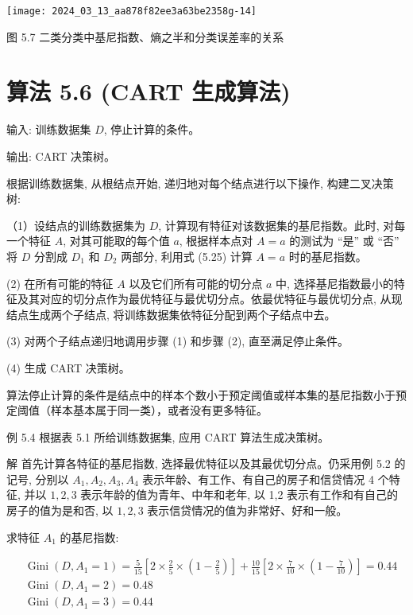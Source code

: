 \documentclass[10pt]{article}
\begin{document}
\begin{CJK*}{UTF8}{bsmi}
\begin{center}
\texttt{[image: 2024\_03\_13\_aa878f82ee3a63be2358g-14]}
\end{center}

图 5.7 二类分类中基尼指数、熵之半和分类误差率的关系

\section*{算法 5.6 (CART 生成算法)}
输入: 训练数据集 $D$, 停止计算的条件。

输出: CART 决策树。

根据训练数据集, 从根结点开始, 递归地对每个结点进行以下操作, 构建二叉决策树:

（1）设结点的训练数据集为 $D$, 计算现有特征对该数据集的基尼指数。此时, 对每一个特征 $A$, 对其可能取的每个值 $a$, 根据样本点对 $A=a$ 的测试为 “是” 或 “否” 将 $D$ 分割成 $D_{1}$ 和 $D_{2}$ 两部分, 利用式 (5.25) 计算 $A=a$ 时的基尼指数。

(2) 在所有可能的特征 $A$ 以及它们所有可能的切分点 $a$ 中, 选择基尼指数最小的特征及其对应的切分点作为最优特征与最优切分点。依最优特征与最优切分点, 从现结点生成两个子结点, 将训练数据集依特征分配到两个子结点中去。

(3) 对两个子结点递归地调用步骤 (1) 和步骤 (2), 直至满足停止条件。

(4) 生成 CART 决策树。

算法停止计算的条件是结点中的样本个数小于预定阈值或样本集的基尼指数小于预定阈值（样本基本属于同一类），或者没有更多特征。

例 5.4 根据表 5.1 所给训练数据集, 应用 CART 算法生成决策树。

解 首先计算各特征的基尼指数, 选择最优特征以及其最优切分点。仍采用例 5.2 的记号, 分别以 $A_{1}, A_{2}, A_{3}, A_{4}$ 表示年龄、有工作、有自己的房子和信贷情况 4 个特征, 并以 $1,2,3$ 表示年龄的值为青年、中年和老年, 以 1,2 表示有工作和有自己的房子的值为是和否, 以 $1,2,3$ 表示信贷情况的值为非常好、好和一般。

求特征 $A_{1}$ 的基尼指数:

$$
\begin{aligned}
& \operatorname{Gini}\left(D, A_{1}=1\right)=\frac{5}{15}\left[2 \times \frac{2}{5} \times\left(1-\frac{2}{5}\right)\right]+\frac{10}{15}\left[2 \times \frac{7}{10} \times\left(1-\frac{7}{10}\right)\right]=0.44 \\
& \operatorname{Gini}\left(D, A_{1}=2\right)=0.48 \\
& \operatorname{Gini}\left(D, A_{1}=3\right)=0.44
\end{aligned}
$$


\end{CJK*}
\end{document}
